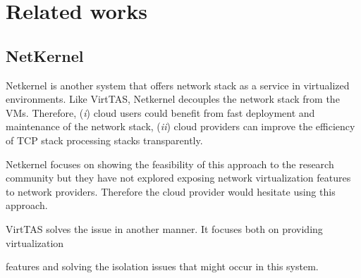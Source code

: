 \section{Related works}
\subsection{NetKernel}
Netkernel is another system that offers network stack as a service in virtualized 
environments. Like VirtTAS, Netkernel decouples the network stack from the VMs. Therefore, 
(\emph{i}) cloud users could benefit from fast deployment and maintenance of the network 
stack, (\emph{ii}) cloud providers can improve the efficiency of TCP stack processing stacks 
transparently. 

Netkernel focuses on showing the feasibility of this approach to the research community but 
they have not explored exposing network virtualization features to network providers. 
Therefore the cloud provider would hesitate using this approach. %

VirtTAS solves the issue in another manner. It focuses both on providing virtualization 

features and solving the isolation issues that might occur in this system. %